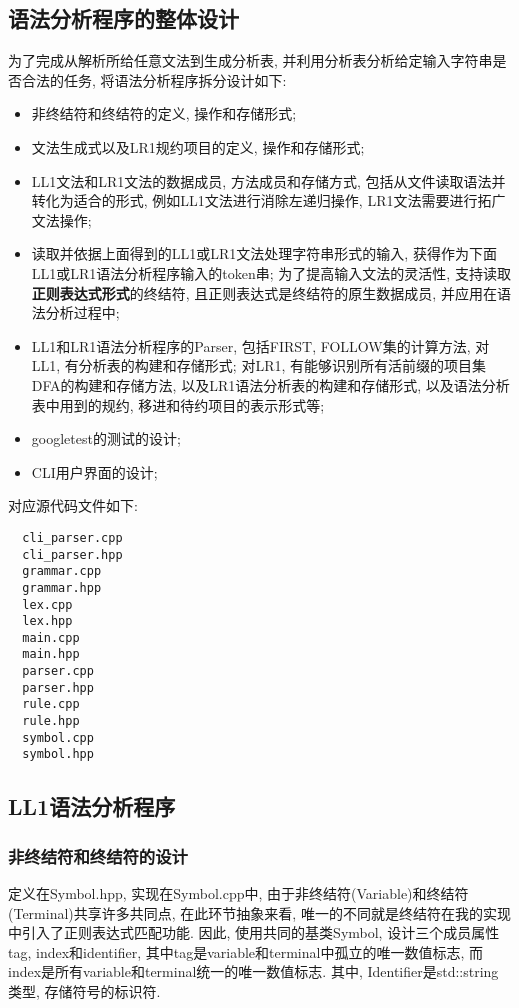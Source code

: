 \subsection{语法分析程序的整体设计}
为了完成从解析所给任意文法到生成分析表,
并利用分析表分析给定输入字符串是否合法的任务, 将语法分析程序拆分设计如下:
\begin{itemize}
	\item 非终结符和终结符的定义, 操作和存储形式;
	\item 文法生成式以及LR1规约项目的定义, 操作和存储形式;
	\item LL1文法和LR1文法的数据成员, 方法成员和存储方式,
	      包括从文件读取语法并转化为适合的形式, 例如LL1文法进行消除左递归操作,
	      LR1文法需要进行拓广文法操作;
	\item 读取并依据上面得到的LL1或LR1文法处理字符串形式的输入,
	      获得作为下面LL1或LR1语法分析程序输入的token串; 为了提高输入文法的灵活性,
	      支持读取\textbf{正则表达式形式}的终结符, 且正则表达式是终结符的原生数据成员,
	      并应用在语法分析过程中;
	\item LL1和LR1语法分析程序的Parser, 包括FIRST, FOLLOW集的计算方法,
	      对LL1, 有分析表的构建和存储形式; 对LR1,
	      有能够识别所有活前缀的项目集DFA的构建和存储方法,
	      以及LR1语法分析表的构建和存储形式, 以及语法分析表中用到的规约,
	      移进和待约项目的表示形式等;
	\item googletest的测试的设计;
	\item CLI用户界面的设计;
\end{itemize}

对应源代码文件如下:

\begin{lstlisting}
  cli_parser.cpp
  cli_parser.hpp
  grammar.cpp
  grammar.hpp
  lex.cpp
  lex.hpp
  main.cpp
  main.hpp
  parser.cpp
  parser.hpp
  rule.cpp
  rule.hpp
  symbol.cpp
  symbol.hpp
\end{lstlisting}

\subsection{LL1语法分析程序}
\subsubsection{非终结符和终结符的设计}
定义在Symbol.hpp, 实现在Symbol.cpp中, 由于非终结符(Variable)和终结符(Terminal)共享许多共同点, 在此环节抽象来看,
唯一的不同就是终结符在我的实现中引入了正则表达式匹配功能. 因此,
使用共同的基类Symbol, 设计三个成员属性tag, index和identifier,
其中tag是variable和terminal中孤立的唯一数值标志,
而index是所有variable和terminal统一的唯一数值标志.
其中, Identifier是std::string类型, 存储符号的标识符.\par

